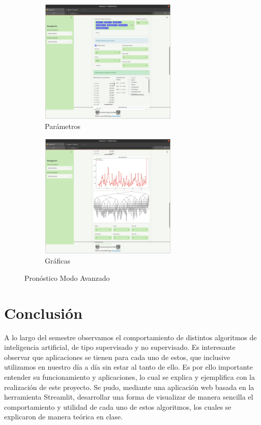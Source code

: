\documentclass[10pt]{article}
\begin{document}
    \begin{figure}[H]
    
    \begin{subfigure}{0.5\textwidth}
    \centering
    \includegraphics[height=6cm]{img/ÁrbolesPronósticoMA.png}
    \caption{Parámetros}
    \label{fig:ArbolMAp}
    \end{subfigure}
    \begin{subfigure}{0.5\textwidth}
    \centering
    \includegraphics[height=6cm]{img/ÁrbolPronósticoMA_graficas.png}
    \caption{Gráficas}
    \label{fig:ArbolMAp2}
    \end{subfigure}
    
    \caption{Pronóstico Modo Avanzado}
    \label{fig:ArbolesMAparametros}
    \end{figure}
    
\section{Conclusión}
A lo largo del semestre observamos el comportamiento de distintos algoritmos de inteligencia artificial, de tipo supervisado y no supervisado. Es interesante observar que aplicaciones se tienen para cada uno de estos, que inclusive utilizamos en nuestro día a día sin estar al tanto de ello. Es por ello importante entender su funcionamiento y aplicaciones, lo cual se explica y ejemplifica con la realización de este proyecto. Se pudo, mediante una aplicación web basada en la herramienta Streamlit, desarrollar una forma de visualizar de manera sencilla el comportamiento y utilidad de cada uno de estos algoritmos, los cuales se explicaron de manera teórica en clase.
\end{document}
